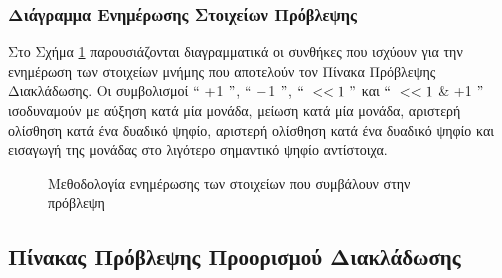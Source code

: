 \subsubsection*{Διάγραμμα Ενημέρωσης Στοιχείων Πρόβλεψης}
\label{chap2_PredictionUpdate}

Στο Σχήμα \ref{fig:chap2_predictor_update} παρουσιάζονται διαγραμματικά οι συνθήκες που ισχύουν για την ενημέρωση των στοιχείων μνήμης που αποτελούν τον Πίνακα Πρόβλεψης Διακλάδωσης. Oι συμβολισμοί $``\ +$1 $"$, $``\ -$1 $"$, $``\ <<1\ "$ και $``\ <<1$ \& +1 $"$ ισοδυναμούν με αύξηση κατά μία μονάδα, μείωση κατά μία μονάδα, αριστερή ολίσθηση κατά ένα δυαδικό ψηφίο, αριστερή ολίσθηση κατά ένα δυαδικό ψηφίο και εισαγωγή της μονάδας στο λιγότερο σημαντικό ψηφίο αντίστοιχα.

\begin{figure}[!h]
    \centering
    \caption{Μεθοδολογία ενημέρωσης των στοιχείων που συμβάλουν στην πρόβλεψη}
    \label{fig:chap2_predictor_update}
\end{figure}


\subsection{Πίνακας Πρόβλεψης Προορισμού Διακλάδωσης}
\label{chap2_BranchTargetBuffer}

